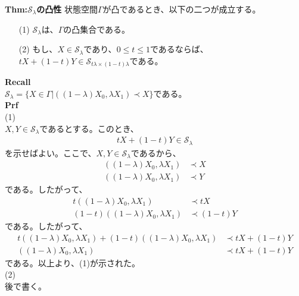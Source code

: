 \documentclass[a4paper,11pt]{jsarticle}
\numberwithin{equation}{section}
\begin{document}
\begin{itembox}[l]{\textbf{Thm:$\mathcal{S}_{\lambda}$の凸性}}
    状態空間$\Gamma$が凸であるとき、以下の二つが成立する。
    \begin{itemize}
        \item[(1)] $\mathcal{S}_{\lambda}$は、$\Gamma$の凸集合である。
        \item[(2)] もし、$X \in \mathcal{S}_{\lambda}$であり、$0 \leq t \leq 1$であるならば、$tX + (1-t)Y \in \mathcal{S}_{t\lambda \times (1-t)\lambda}$である。
    \end{itemize}
\end{itembox}
\textbf{Recall}\\
$\mathcal{S}_{\lambda}= \{X \in \Gamma|((1-\lambda)X_0,\lambda X_1) \prec X\}$である。\\
\textbf{Prf}\\
(1)\\
$X,Y \in \mathcal{S}_{\lambda}$であるとする。このとき、
\begin{align}
    tX+(1-t)Y \in \mathcal{S}_{\lambda}
\end{align}
を示せばよい。ここで、$X,Y \in \mathcal{S}_{\lambda}$であるから、
\begin{align}
    ((1-\lambda)X_0,\lambda X_1) &\prec X\\
    ((1-\lambda)X_0,\lambda X_1) &\prec Y
\end{align}
である。したがって、
\begin{align}
    t((1-\lambda)X_0,\lambda X_1) &\prec tX\\
    (1-t)((1-\lambda)X_0,\lambda X_1) &\prec (1-t)Y
\end{align}
である。したがって、
\begin{align}
    t((1-\lambda)X_0,\lambda X_1)+(1-t)((1-\lambda)X_0,\lambda X_1) &\prec tX+(1-t)Y\\
    ((1-\lambda)X_0,\lambda X_1) &\prec tX+(1-t)Y
\end{align}
である。以上より、(1)が示された。\\
(2)\\
後で書く。\\
\end{document}
